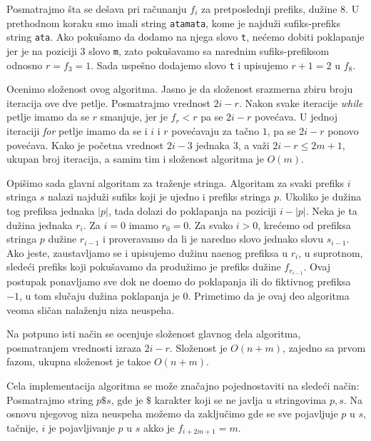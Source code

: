 Posmatrajmo \v sta se de\v sava pri ra\v cunanju $f_i$ za pretposlednji prefiks, du\v zine $8$. U prethodnom koraku smo imali string \texttt{atamata}, kome je najdu\v zi sufiks-prefiks string \texttt{ata}. Ako poku\v samo da dodamo na njega slovo \texttt{t}, ne\' cemo dobiti poklapanje jer je na poziciji $3$ slovo \texttt{m}, zato poku\v savamo sa narednim sufiks-prefiksom odnosno $r = f_3 = 1$. Sada uspe\v sno dodajemo slovo \texttt{t} i upisujemo $r+1 = 2$ u $f_8$.



Ocenimo slo\v zenost ovog algoritma. Jasno je da slo\v zenost srazmerna zbiru broju iteracija ove dve petlje. Posmatrajmo vrednost $2i-r$. Nakon svake iteracije \textit{while} petlje imamo da se $r$ smanjuje, jer je $f_r < r$ pa se $2i-r$ pove\' cava. U jednoj iteraciji \textit{for} petlje imamo da se i $i$ i $r$ pove\' cavaju za ta\v cno $1$, pa se $2i-r$ ponovo pove\' cava. Kako je po\v cetna vrednost $2i-3$ jednaka $3$, a va\v zi $2i-r \leq 2m+1$, ukupan broj iteracija, a samim tim i slo\v zenost algoritma je $O(m)$.

Opi\v simo sada glavni algoritam za tra\v zenje stringa. Algoritam za svaki prefiks $i$ stringa $s$ nalazi najdu\v zi sufiks koji je ujedno i prefiks stringa $p$. Ukoliko je du\v zina tog prefiksa jednaka $|p|$, tada dolazi do poklapanja na poziciji $i-|p|$. Neka je ta du\v zina jednaka $r_i$. Za $i=0$ imamo $r_0 = 0$. Za svako $i>0$, kre\' cemo od prefiksa stringa $p$ du\v zine $r_{i-1}$ i proveravamo da li je naredno slovo jednako slovu $s_{i-1}$. Ako jeste, zaustavljamo se i upisujemo du\v zinu na\dj enog prefiksa u $r_i$, u suprotnom, slede\' ci prefiks koji poku\v savamo da produ\v zimo je prefiks du\v zine $f_{r_{i-1}}$. Ovaj postupak ponavljamo sve dok ne do\dj emo do poklapanja ili do fiktivnog prefiksa $-1$, u tom slu\v caju du\v zina poklapanja je $0$. Primetimo da je ovaj deo algoritma veoma sli\v can nala\v zenju niza neuspeha.



Na potpuno isti na\v cin se ocenjuje slo\v zenost glavnog dela algoritma, posmatranjem vrednosti izraza $2i-r$. Slo\v zenost je $O(n+m)$, zajedno sa prvom fazom, ukupna slo\v zenost je tako\dj e $O(n+m)$.

Cela implementacija algoritma se mo\v ze zna\v cajno pojednostaviti na slede\' ci na\v cin: Posmatrajmo string $p\$s$, gde je $\$$ karakter koji se ne javlja u stringovima $p,s$. Na osnovu njegovog niza neuspeha mo\v zemo da zaklju\v cimo gde se sve pojavljuje $p$ u $s$, ta\v cnije, $i$ je pojavljivanje $p$ u $s$ akko je $f_{i+2m+1} = m$.

